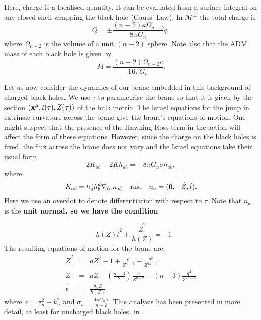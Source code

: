 \documentclass[a4paper,12pt]{article}
\begin{document}
Here, charge is a localised quantity. It can be evaluated from a
surface integral on any closed shell wrapping the black hole (Gauss'
Law). In $\mathcal{M}^{\pm}$ the total charge is
\begin{equation}
Q=\pm \frac{(n-2)\kappa \Omega_{n-2}}{8\pi G_n} q,
\end{equation}  
where $\Omega_{n-2}$ is the volume of a unit $(n-2)$ sphere. Note also
that the ADM mass \cite{Hawking:adsblackholes} of each black hole is
given by
\begin{equation}
M=\frac{(n-2)\Omega_{n-2}c}{16 \pi G_n}.
\end{equation}

Let us now consider the dynamics of our brane embedded in this
background of charged black holes. We use $\tau$ to parametrise the
brane so that it is given by the section $({\bf{x} \rm}^{\mu},
t(\tau), Z(\tau))$ of the bulk metric.  The Israel equations for the
jump in extrinsic curvature across the brane give the brane's
equations of motion. One might suspect that the presence  of the
Hawking-Ross term in the action will affect the form of these
equations. However, since the charge on the black holes is fixed, the
flux across the brane does not vary and the Israel equations take
their usual form
\begin{equation}
2K_{ab} - 2K h_{ab} = -8\pi G_n \sigma h_{ab},
\end{equation}
where
\begin{equation}
K_{ab} = h_{a}^c h_{b}^d \nabla_{\left(c\right.}n_{\left.d\right)}
\quad \textrm{and} \quad n_a=({\bf 0}, -\dot{Z},\dot{t}).
\end{equation}
Here we use an overdot to denote differentiation with respect to
$\tau$.  Note that $n_a$ is the \bf{unit} \rm normal, so we have the
condition

\begin{equation} \label{eqn:condition}
-h(Z)\dot{t}^2+\frac{\dot{Z}^2}{h(Z)}=-1
\end{equation}
The resulting equations of motion for the brane are:
\begin{subequations}
\begin{eqnarray}
\dot{Z}^2 & = & a Z^2 - 1 + \frac{c}{Z^{n-3}} - \frac{q^2}{Z^{2n-6}}
\label{eqn:evolution:a}\\ \ddot{Z} & = & a Z -
\left(\frac{n-3}{2}\right)\frac{c}{Z^{n-2}} +
(n-3)\frac{q^2}{Z^{2n-5}} \label{eqn:evolution:b}\\ \dot{t} & = &
\frac{\sigma_n Z}{h(Z)} \label{eqn:evolution:c}
\end{eqnarray}
\end{subequations}
where $a=\sigma_n^2 - k_n^2$ and $\sigma_n = \frac{4\pi G_n
\sigma}{n-2}$. This analysis has been presented in more detail, at
least for uncharged black holes, in \cite{Bowcock:branecos,
Petkou:brane}.
\end{document}
